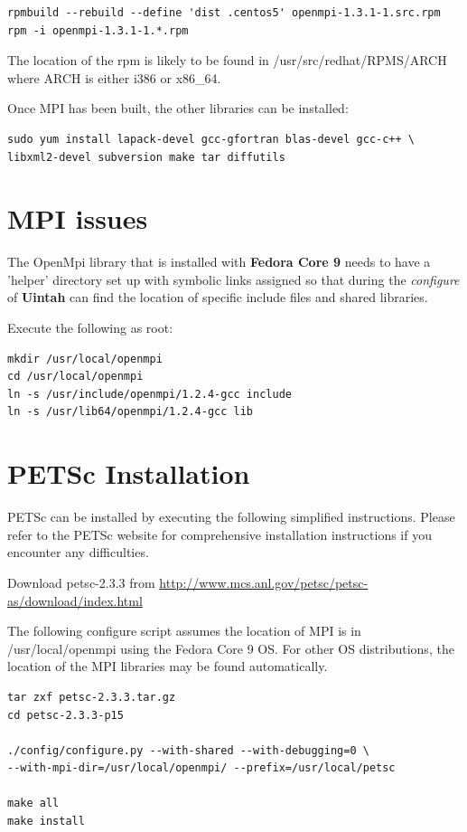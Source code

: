 \documentclass[12pt]{article}
\begin{document}
\begin{Verbatim}
rpmbuild --rebuild --define 'dist .centos5' openmpi-1.3.1-1.src.rpm
rpm -i openmpi-1.3.1-1.*.rpm
\end{Verbatim}
The location of the rpm is likely to be found in
/usr/src/redhat/RPMS/ARCH where ARCH is either i386 or x86\_64.

Once MPI has been built, the other libraries can be installed:
\begin{verbatim}
sudo yum install lapack-devel gcc-gfortran blas-devel gcc-c++ \
libxml2-devel subversion make tar diffutils
\end{verbatim}

\section{MPI issues} 
\label{sec:mpi}

The OpenMpi library that is installed with \textbf{Fedora Core 9}
needs to have a 'helper' directory set up with symbolic links assigned
so that during the \emph{configure} of \textbf{Uintah} can find the
location of specific include files and shared libraries.

Execute the following as root:

\begin{Verbatim}
mkdir /usr/local/openmpi
cd /usr/local/openmpi
ln -s /usr/include/openmpi/1.2.4-gcc include
ln -s /usr/lib64/openmpi/1.2.4-gcc lib
\end{Verbatim}



\section{PETSc Installation}

PETSc can be installed by executing the following simplified
instructions.  Please refer to the PETSc website for comprehensive
installation instructions if you encounter any difficulties.

Download petsc-2.3.3 from
\url{http://www.mcs.anl.gov/petsc/petsc-as/download/index.html}

The following configure script assumes the location of MPI is in
/usr/local/openmpi using the Fedora Core 9 OS.  For other OS
distributions, the location of the MPI libraries may be found
automatically.

\begin{Verbatim}
tar zxf petsc-2.3.3.tar.gz
cd petsc-2.3.3-p15

./config/configure.py --with-shared --with-debugging=0 \ 
--with-mpi-dir=/usr/local/openmpi/ --prefix=/usr/local/petsc

make all
make install
\end{Verbatim}
\end{document}
